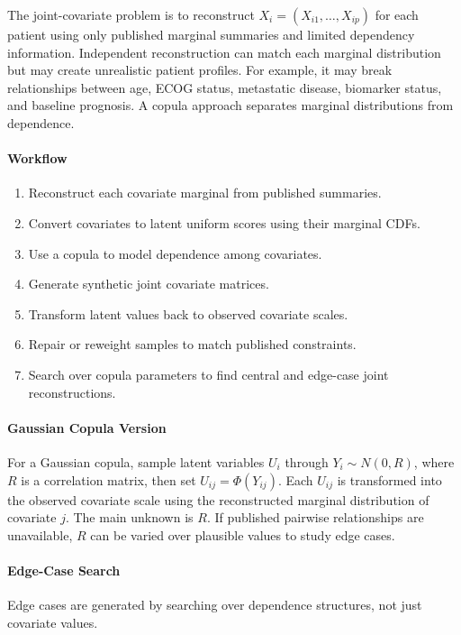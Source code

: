 \documentclass[11pt]{article}
\begin{document}
The joint-covariate problem is to reconstruct \(X_i=(X_{i1},\ldots,X_{ip})\) for each patient using only published marginal summaries and limited dependency information.
Independent reconstruction can match each marginal distribution but may create unrealistic patient profiles. For example, it may break relationships between age, ECOG status, metastatic disease, biomarker status, and baseline prognosis.
A copula approach separates marginal distributions from dependence.

\paragraph*{Workflow}

\begin{enumerate}
\item Reconstruct each covariate marginal from published summaries.
\item Convert covariates to latent uniform scores using their marginal CDFs.
\item Use a copula to model dependence among covariates.
\item Generate synthetic joint covariate matrices.
\item Transform latent values back to observed covariate scales.
\item Repair or reweight samples to match published constraints.
\item Search over copula parameters to find central and edge-case joint reconstructions.
\end{enumerate}

\paragraph*{Gaussian Copula Version}

For a Gaussian copula, sample latent variables \(U_i\) through \(Y_i\sim N(0,R)\), where \(R\) is a correlation matrix, then set \(U_{ij}=\Phi(Y_{ij})\). Each \(U_{ij}\) is transformed into the observed covariate scale using the reconstructed marginal distribution of covariate \(j\).    
The main unknown is \(R\). If published pairwise relationships are unavailable, \(R\) can be varied over plausible values to study edge cases.

\paragraph*{Edge-Case Search}

Edge cases are generated by searching over dependence structures, not just covariate values.
\end{document}
